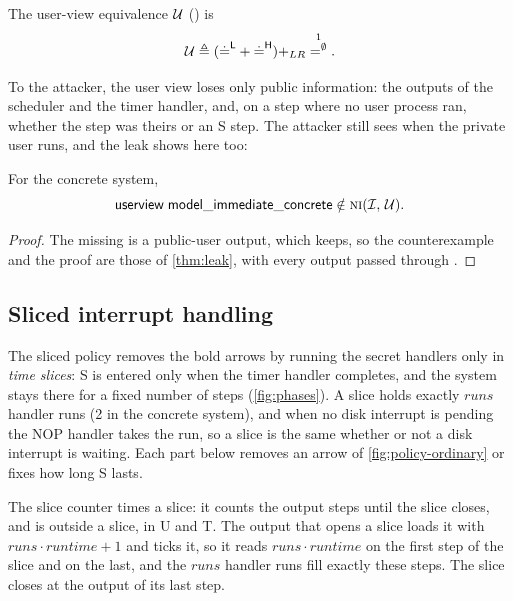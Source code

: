 \begin{definition}\label{def:userview}
The user-view equivalence $\mathcal{U}$ () is
\[
\Euser \triangleq (\pubeq + \priveq) +_{LR} \one^\emptyset.
\]
\end{definition}

To the attacker, the user view loses only public information: the outputs of the
scheduler and the timer handler, and, on a step where no user process ran, whether
the step was theirs or an S step. The attacker still sees when the private user runs,
and the leak shows here too:

\begin{corollary}\label{cor:leak-userview}
For the concrete system,
\[
\mathsf{userview}\;\mathsf{model\_immediate\_concrete}
  \notin \text{\normalfont\scshape ni}(\mathcal{I},\, \mathcal{U}).
\]
\end{corollary}

\begin{proof}
The missing  is a public-user output, which 
keeps, so the counterexample and the proof are those of \cref{thm:leak}, with
every output passed through .
\end{proof}

\subsection{Sliced interrupt handling}\label{sec:sliced}

The sliced policy removes the bold arrows by running the secret handlers only in
\emph{time slices}: S is entered only when the timer handler completes, and the
system stays there for a fixed number of steps (\cref{fig:phases}). A slice holds
exactly $\mathit{runs}$ handler runs (2 in the concrete system), and when no disk
interrupt is pending the NOP handler takes the run, so a slice is the same whether or
not a disk interrupt is waiting. Each part below
removes an arrow of \cref{fig:policy-ordinary} or fixes how long S lasts.

The slice counter times a slice: it counts the output steps until the slice closes,
and is  outside a slice, in U and T. The output that opens a slice
loads it with $\mathit{runs}\cdot\mathit{runtime}+1$ and ticks it, so it reads
$\mathit{runs}\cdot\mathit{runtime}$ on the first step of the slice and  on the
last, and the $\mathit{runs}$ handler runs fill exactly these steps. The slice closes
at the output of its last step.

